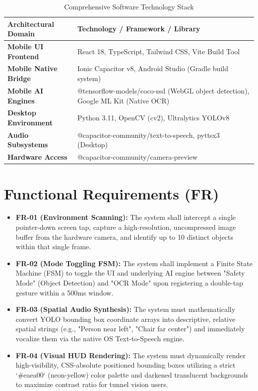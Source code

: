 \documentclass[12pt, a4paper]{report}
\begin{document}
\begin{table}[H]
\centering
\caption{Comprehensive Software Technology Stack}
\renewcommand{\arraystretch}{1.5}
\begin{tabular}{|p{4.5cm}|p{10cm}|}
\hline
\textbf{Architectural Domain} & \textbf{Technology / Framework / Library} \\ \hline
\textbf{Mobile UI Frontend} & React 18, TypeScript, Tailwind CSS, Vite Build Tool \\ \hline
\textbf{Mobile Native Bridge} & Ionic Capacitor v8, Android Studio (Gradle build system) \\ \hline
\textbf{Mobile AI Engines} & @tensorflow-models/coco-ssd (WebGL object detection), Google ML Kit (Native OCR) \\ \hline
\textbf{Desktop Environment} & Python 3.11, OpenCV (cv2), Ultralytics YOLOv8 \\ \hline
\textbf{Audio Subsystems} & @capacitor-community/text-to-speech, pyttsx3 (Desktop) \\ \hline
\textbf{Hardware Access} & @capacitor-community/camera-preview \\ \hline
\end{tabular}
\end{table}

\section{Functional Requirements (FR)}
\begin{itemize}[label=$\blacksquare$]
    \item \textbf{FR-01 (Environment Scanning):} The system shall intercept a single pointer-down screen tap, capture a high-resolution, uncompressed image buffer from the hardware camera, and identify up to 10 distinct objects within that single frame.
    \item \textbf{FR-02 (Mode Toggling FSM):} The system shall implement a Finite State Machine (FSM) to toggle the UI and underlying AI engine between "Safety Mode" (Object Detection) and "OCR Mode" upon registering a double-tap gesture within a 500ms window.
    \item \textbf{FR-03 (Spatial Audio Synthesis):} The system must mathematically convert YOLO bounding box coordinate arrays into descriptive, relative spatial strings (e.g., "Person near left", "Chair far center") and immediately vocalize them via the native OS Text-to-Speech engine.
    \item \textbf{FR-04 (Visual HUD Rendering):} The system must dynamically render high-visibility, CSS-absolute positioned bounding boxes utilizing a strict `#eaea00` (neon-yellow) color palette and darkened translucent backgrounds to maximize contrast ratio for tunnel vision users.
\end{itemize}
\end{document}
